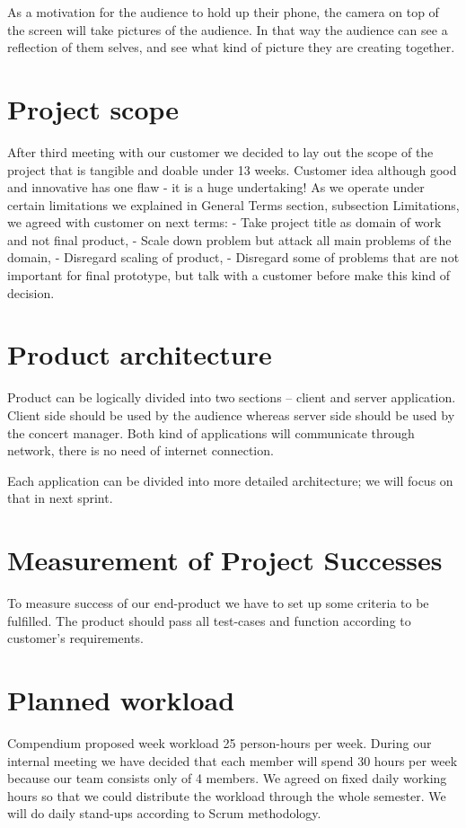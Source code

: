 \documentclass{report}
\begin{document}
As a motivation for the audience to hold up their phone, the camera on top of the screen will take pictures of the audience.
In that way the audience can see a reflection of them selves, and see what kind of picture they are creating together.  

\section{Project scope}

After third meeting with our customer we decided to lay out the scope of the project that is tangible and doable under 13 weeks. Customer idea although good and innovative has one flaw - it is a huge undertaking!
As we operate under certain limitations we explained in General Terms section, subsection Limitations, we agreed with customer on next terms:
 - Take project title as domain of work and not final product,
 - Scale down problem but attack all main problems of the domain,
 - Disregard scaling of product,
 - Disregard some of problems that are not important for final prototype, but talk with a customer before make this kind of decision.

\section{Product architecture}
Product can be logically divided into two sections -- client and server application.
Client side should be used by the audience whereas server side should be used by the concert manager.
Both kind of applications will communicate through network, there is no need of internet connection.

Each application can be divided into more detailed architecture; we will focus on that in next sprint.


\section{Measurement of Project Successes}
To measure success of our end-product we have to set up some criteria to be fulfilled. The product should pass all test-cases and function according to customer's requirements.

\section{Planned workload}
Compendium proposed week workload 25 person-hours per week. During our internal meeting we have decided that each member will spend 30 hours per week because our team consists only of 4 members. We agreed on fixed daily working hours so that we could distribute the workload through the whole semester. We will do daily stand-ups according to Scrum methodology.
\end{document}
